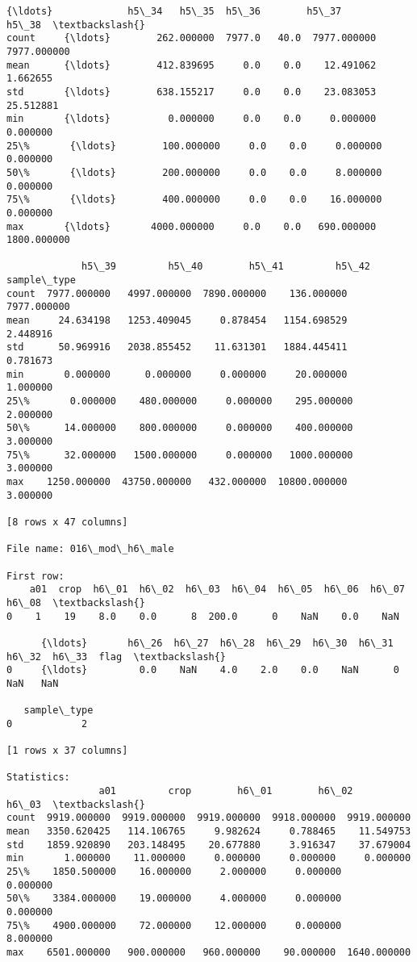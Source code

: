 \documentclass[11pt]{article}
\begin{document}
\begin{Verbatim}[commandchars=\\\{\}]
          {\ldots}             h5\_34   h5\_35  h5\_36        h5\_37        h5\_38  \textbackslash{}
count     {\ldots}        262.000000  7977.0   40.0  7977.000000  7977.000000   
mean      {\ldots}        412.839695     0.0    0.0    12.491062     1.662655   
std       {\ldots}        638.155217     0.0    0.0    23.083053    25.512881   
min       {\ldots}          0.000000     0.0    0.0     0.000000     0.000000   
25\%       {\ldots}        100.000000     0.0    0.0     0.000000     0.000000   
50\%       {\ldots}        200.000000     0.0    0.0     8.000000     0.000000   
75\%       {\ldots}        400.000000     0.0    0.0    16.000000     0.000000   
max       {\ldots}       4000.000000     0.0    0.0   690.000000  1800.000000   

             h5\_39         h5\_40        h5\_41         h5\_42  sample\_type  
count  7977.000000   4997.000000  7890.000000    136.000000  7977.000000  
mean     24.634198   1253.409045     0.878454   1154.698529     2.448916  
std      50.969916   2038.855452    11.631301   1884.445411     0.781673  
min       0.000000      0.000000     0.000000     20.000000     1.000000  
25\%       0.000000    480.000000     0.000000    295.000000     2.000000  
50\%      14.000000    800.000000     0.000000    400.000000     3.000000  
75\%      32.000000   1500.000000     0.000000   1000.000000     3.000000  
max    1250.000000  43750.000000   432.000000  10800.000000     3.000000  

[8 rows x 47 columns]

File name: 016\_mod\_h6\_male

First row: 
    a01  crop  h6\_01  h6\_02  h6\_03  h6\_04  h6\_05  h6\_06  h6\_07  h6\_08  \textbackslash{}
0    1    19    8.0    0.0      8  200.0      0    NaN    0.0    NaN   

      {\ldots}       h6\_26  h6\_27  h6\_28  h6\_29  h6\_30  h6\_31  h6\_32  h6\_33  flag  \textbackslash{}
0     {\ldots}         0.0    NaN    4.0    2.0    0.0    NaN      0    NaN   NaN   

   sample\_type  
0            2  

[1 rows x 37 columns]

Statistics: 
                a01         crop        h6\_01        h6\_02        h6\_03  \textbackslash{}
count  9919.000000  9919.000000  9919.000000  9918.000000  9919.000000   
mean   3350.620425   114.106765     9.982624     0.788465    11.549753   
std    1859.920890   203.148495    20.677880     3.916347    37.679004   
min       1.000000    11.000000     0.000000     0.000000     0.000000   
25\%    1850.500000    16.000000     2.000000     0.000000     0.000000   
50\%    3384.000000    19.000000     4.000000     0.000000     0.000000   
75\%    4900.000000    72.000000    12.000000     0.000000     8.000000   
max    6501.000000   900.000000   960.000000    90.000000  1640.000000   


\end{Verbatim}
\end{document}
